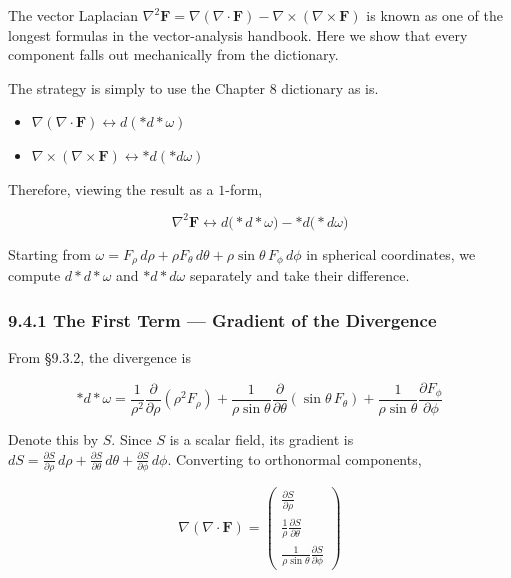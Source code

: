 \documentclass[a4paper,12pt,openany]{book}
\begin{document}
The vector Laplacian
\(\nabla^2\mathbf{F} = \nabla(\nabla\cdot\mathbf{F}) - \nabla\times(\nabla\times\mathbf{F})\)
is known as one of the longest formulas in the vector-analysis handbook.
Here we show that every component falls out mechanically from the
dictionary.

The strategy is simply to use the Chapter 8 dictionary as is.

\begin{itemize}
\item
  \(\nabla(\nabla\cdot\mathbf{F}) \leftrightarrow d(\ast d\ast\omega)\)
\item
  \(\nabla\times(\nabla\times\mathbf{F}) \leftrightarrow \ast d(\ast d\omega)\)
\end{itemize}

Therefore, viewing the result as a \(1\)-form,

\[\nabla^2\mathbf{F} \leftrightarrow d\bigl(\ast d\ast\omega\bigr)-\ast d\bigl(\ast d\omega\bigr)\]

Starting from
\(\omega = F_\rho\,d\rho + \rho F_\theta\,d\theta + \rho\sin\theta\,F_\phi\,d\phi\)
in spherical coordinates, we compute \(d\ast d\ast\omega\) and
\(\ast d\ast d\omega\) separately and take their difference.

\hypertarget{the-first-term-gradient-of-the-divergence}{%
\subsubsection{9.4.1 The First Term — Gradient of the
Divergence}\label{the-first-term-gradient-of-the-divergence}}

From §9.3.2, the divergence is

\[\ast d\ast\omega = \frac{1}{\rho^2}\frac{\partial}{\partial\rho}(\rho^2 F_\rho) + \frac{1}{\rho\sin\theta}\frac{\partial}{\partial\theta}(\sin\theta\,F_\theta) + \frac{1}{\rho\sin\theta}\frac{\partial F_\phi}{\partial\phi}\]

Denote this by \(S\). Since \(S\) is a scalar field, its gradient is
\(dS = \frac{\partial S}{\partial\rho}\,d\rho + \frac{\partial S}{\partial\theta}\,d\theta + \frac{\partial S}{\partial\phi}\,d\phi\).
Converting to orthonormal components,

\[\nabla(\nabla\cdot\mathbf{F}) = \begin{pmatrix}
\frac{\partial S}{\partial\rho} \\[0.5em]
\frac{1}{\rho}\frac{\partial S}{\partial\theta} \\[0.5em]
\frac{1}{\rho\sin\theta}\frac{\partial S}{\partial\phi}
\end{pmatrix}\]
\end{document}
